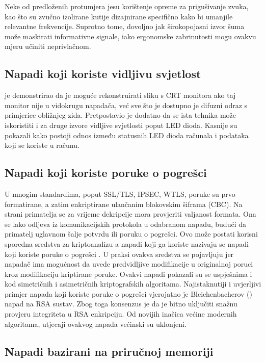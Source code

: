 \documentclass[times, utf8, diplomski]{fer}
\begin{document}
Neke od predloženih protumjera jesu korištenje opreme za prigušivanje zvuka, kao što su zvučno izolirane kutije dizajnirane specifično kako bi umanjile relevantne frekvencije. Suprotno tome, dovoljno jak širokopojasni izvor šuma može maskirati informativne signale, iako ergonomske zabrinutosti mogu ovakvu mjeru učiniti neprivlačnom.

\subsection{Napadi koji koriste vidljivu svjetlost}
\cite{kuhn2002optical} je demonstrirao da je moguće rekonstruirati sliku s CRT monitora ako taj monitor nije u vidokrugu napadača, već sve što je dostupno je difuzni odraz s primjerice obližnjeg zida. Pretpostavio je dodatno da se ista tehnika može iskoristiti i za druge izvore vidljive svjetlosti poput LED dioda. Kasnije su \cite{loughry2002information} pokazali kako postoji odnos između statusnih LED dioda računala i podataka koji se koriste u računu.

\subsection{Napadi koji koriste poruke o pogrešci}
U mnogim standardima, poput SSL/TLS, IPSEC, WTLS, poruke su prvo formatirane, a zatim enkriptirane ulančanim blokovskim šiframa (CBC). Na strani primatelja se za vrijeme dekripcije mora provjeriti valjanost formata. Ona se lako odljeva iz komunikacijskih protokola u odabranom napadu, budući da primatelj uglavnom šalje potvrdu ili poruku o pogrešci. Ovo može postati korisni sporedna sredstva za kriptoanalizu a napadi koji ga koriste nazivaju se napadi koji koriste poruke o pogrešci . U praksi ovakva sredstva se pojavljuju jer napadač ima mogućnost da uvede predvidljive modifikacije u originalnoj poruci kroz modifikaciju kriptirane poruke. Ovakvi napadi pokazali su se uspješnima i kod simetričnih i asimetričnih kriptografskih algoritama. Najistaknutiji i uvjerljivi primjer napada koji koriste poruke o pogrešci vjerojatno je Bleichenbacherov (\citeyear{bleichenbacher1998chosen}) napad na RSA sustav. Zbog toga konsenzus je da je bitno uključiti snažnu provjeru integriteta u RSA enkripciju. Od novijih inačica većine modernih algoritama, utjecaji ovakvog napada većinski su uklonjeni.

\subsection{Napadi bazirani na priručnoj memoriji}
\end{document}
